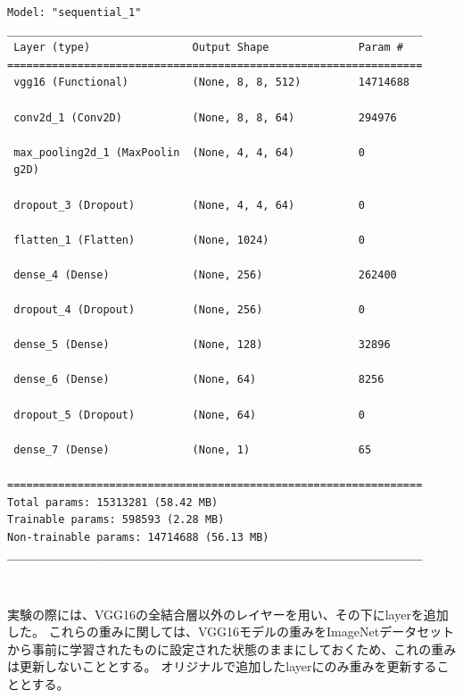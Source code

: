 \documentclass[a4paper, 11pt, titlepage]{jsarticle}
\begin{document}
{\fontsize{10pt}{8pt}\selectfont
\begin{BVerbatim}
Model: "sequential_1"
_________________________________________________________________
 Layer (type)                Output Shape              Param #   
=================================================================
 vgg16 (Functional)          (None, 8, 8, 512)         14714688  
                                                                 
 conv2d_1 (Conv2D)           (None, 8, 8, 64)          294976    
                                                                 
 max_pooling2d_1 (MaxPoolin  (None, 4, 4, 64)          0         
 g2D)                                                            
                                                                 
 dropout_3 (Dropout)         (None, 4, 4, 64)          0         
                                                                 
 flatten_1 (Flatten)         (None, 1024)              0         
                                                                 
 dense_4 (Dense)             (None, 256)               262400    
                                                                 
 dropout_4 (Dropout)         (None, 256)               0         
                                                                 
 dense_5 (Dense)             (None, 128)               32896     
                                                                 
 dense_6 (Dense)             (None, 64)                8256      
                                                                 
 dropout_5 (Dropout)         (None, 64)                0         
                                                                 
 dense_7 (Dense)             (None, 1)                 65        
                                                                 
=================================================================
Total params: 15313281 (58.42 MB)
Trainable params: 598593 (2.28 MB)
Non-trainable params: 14714688 (56.13 MB)
_________________________________________________________________
\end{BVerbatim}
}\par
　\par
実験の際には、VGG16の全結合層以外のレイヤーを用い、その下にlayerを追加した。
これらの重みに関しては、VGG16モデルの重みをImageNetデータセットから事前に学習されたものに設定された状態のままにしておくため、これの重みは更新しないこととする。
オリジナルで追加したlayerにのみ重みを更新することとする。
\end{document}
